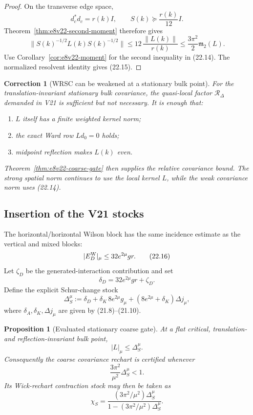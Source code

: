 \documentclass[11pt,oneside]{book}
\newtheorem{proposition}[theorem]{Proposition}
\newtheorem{correction}[theorem]{Correction}
\theoremstyle{definition}
\theoremstyle{remark}
\begin{document}
\begin{proof}
On the transverse edge space,
\[
 d_c^*d_c=r(k)I,
\qquad
 S(k)\succeq\frac{r(k)}{12}I.
\]
Theorem~\ref{thm:e8v22-second-moment} therefore gives
\[
\|S(k)^{-1/2}L(k)S(k)^{-1/2}\|
\leq12\,\frac{\|L(k)\|}{r(k)}
\leq\frac{3\pi^2}{2}\mathfrak m_2(L).
\]
Use Corollary~\ref{cor:e8v22-moment} for the second inequality in
(22.14).  The normalized resolvent identity gives (22.15).
\end{proof}

\begin{correction}[WRSC can be weakened at a stationary bulk point]
\label{corr:e8v22-WRSC}
For the translation-invariant stationary bulk covariance, the
quasi-local factor \(\mathcal R_\Delta\) demanded in V21 is sufficient
but not necessary.  It is enough that:
\begin{enumerate}
\item \(L\) itself has a finite weighted kernel norm;
\item the exact Ward row \(Ld_0=0\) holds;
\item midpoint reflection makes \(L(k)\) even.
\end{enumerate}
Theorem~\ref{thm:e8v22-coarse-gate} then supplies the relative
covariance bound.  The strong spatial norm continues to use the local
kernel \(L\), while the weak covariance norm uses (22.14).
\end{correction}

\subsection{Insertion of the V21 stocks}

The horizontal/horizontal Wilson block has the same incidence estimate
as the vertical and mixed blocks:
\[
 |E_D^{\rm W}|_\mu\leq32e^{2\mu}gr.                \tag{22.16}
\]
Let \(\zeta_D\) be the generated-interaction contribution and set
\[
 \delta_D=32e^{2\mu}gr+\zeta_D.                    \tag{22.17}
\]
Define the explicit Schur-change stock
\[
\Delta_S^\mu:=
\delta_D+\delta_K\,8e^{2\mu}g_\mu
 +(8e^{2\mu}+\delta_K)\Delta j_\mu,                \tag{22.18}
\]
where \(\delta_A,\delta_K,\Delta j_\mu\) are given by
(21.8)--(21.10).

\begin{proposition}[Evaluated stationary coarse gate]
\label{prop:e8v22-evaluated}
At a flat critical, translation- and reflection-invariant bulk point,
\[
                         |L|_\mu\leq\Delta_S^\mu.                  \tag{22.19}
\]
Consequently the coarse covariance rechart is certified whenever
\[
\boxed{\qquad
\frac{3\pi^2}{\mu^2}\Delta_S^\mu<1.
\qquad}                                                           \tag{22.20}
\]
Its Wick-rechart contraction stock may then be taken as
\[
\chi_S=
\frac{(3\pi^2/\mu^2)\Delta_S^\mu}
     {1-(3\pi^2/\mu^2)\Delta_S^\mu}.               \tag{22.21}
\]
\end{proposition}
\end{document}
